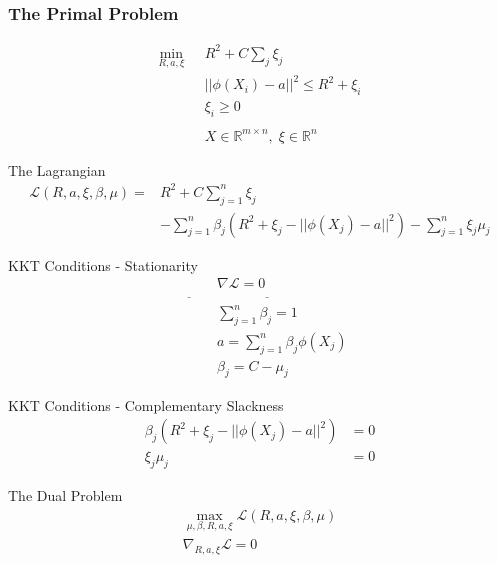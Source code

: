 \documentclass{beamer}
\begin{document}

\begin{frame}
\frametitle{The Primal Problem}
\begin{align} \label{P1}
    \min_{R,a,\xi} \textit{ } &R^2 + C\sum_{j} \xi_j\nonumber \\
    &||\phi(X_i) - a||^2\leq R^2 + \xi_i\nonumber\\
    &\xi_i \geq 0 \textit{ }\nonumber\\~ \nonumber\\
    &X\in \mathbb{R}^{m\times n}\nonumber, \;\xi \in \mathbb{R}^n
\end{align}

\end{frame}
\begin{frame}{The Lagrangian}
    \begin{align*}
    \mathcal{L}(R,a,\xi,\beta,\mu) =& R^2 + C\sum_{j=1}^n \xi_j  \\&-\sum_{j=1}^n\beta_j( R^2 + \xi_j-||\phi(X_j) - a||^2) - \sum_{j=1}^n \xi_j  \mu_j
\end{align*}
\end{frame}
\begin{frame}{KKT Conditions - Stationarity}
    \begin{align*}
    &\nabla \mathcal{L}=0  \\\underline{\hspace{1cm}}&\underline{\hspace{3cm}}\\
    &\sum_{j=1}^n \beta_j = 1
    \\ &a = \sum_{j=1}^n \beta_j \phi(X_j)
    \\ &\beta_j = C - \mu_j
\end{align*}
\end{frame}
\begin{frame}{KKT Conditions - Complementary Slackness}
    \begin{align*}
    \beta_j( R^2 + \xi_j-||\phi(X_j) - a||^2) &= 0\nonumber\\
    \xi_j  \mu_j &= 0
\end{align*}
\end{frame}

\begin{frame}{The Dual Problem}
    \begin{align*}
    \max_{\mu,\beta,R,a,\xi} \mathcal{L}(R,a,\xi,\beta,\mu) \\
    \nabla_{R,a,\xi}\mathcal{L}= 0 \nonumber
\end{align*}
\end{frame}
\end{document}
